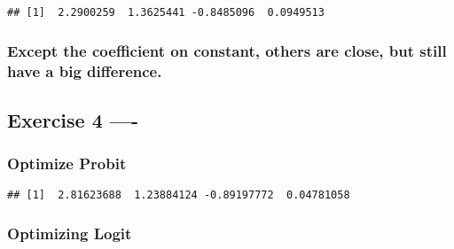 \documentclass[]{article}
\newenvironment{Shaded}{\begin{snugshade}}{\end{snugshade}}
\newcommand{\KeywordTok}[1]{\textcolor[rgb]{0.13,0.29,0.53}{\textbf{#1}}}
\newcommand{\DataTypeTok}[1]{\textcolor[rgb]{0.13,0.29,0.53}{#1}}
\newcommand{\DecValTok}[1]{\textcolor[rgb]{0.00,0.00,0.81}{#1}}
\newcommand{\StringTok}[1]{\textcolor[rgb]{0.31,0.60,0.02}{#1}}
\newcommand{\OperatorTok}[1]{\textcolor[rgb]{0.81,0.36,0.00}{\textbf{#1}}}
\newcommand{\NormalTok}[1]{#1}
\begin{document}
\begin{verbatim}
## [1]  2.2900259  1.3625441 -0.8485096  0.0949513
\end{verbatim}

\subsubsection{Except the coefficient on constant, others are close, but
still have a big
difference.}\label{except-the-coefficient-on-constant-others-are-close-but-still-have-a-big-difference.}

\subsection{Exercise 4 ----}\label{exercise-4--}

\subsubsection{Optimize Probit}\label{optimize-probit}

\begin{Shaded}
\end{Shaded}

\begin{verbatim}
## [1]  2.81623688  1.23884124 -0.89197772  0.04781058
\end{verbatim}

\subsubsection{Optimizing Logit}\label{optimizing-logit}
\end{document}
